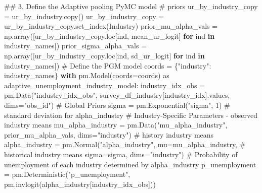\documentclass[
]{agujournal2019}
\newenvironment{Shaded}{\begin{snugshade}}{\end{snugshade}}
\newcommand{\CommentTok}[1]{\textcolor[rgb]{0.37,0.37,0.37}{#1}}
\newcommand{\ControlFlowTok}[1]{\textcolor[rgb]{0.00,0.23,0.31}{\textbf{#1}}}
\newcommand{\DecValTok}[1]{\textcolor[rgb]{0.68,0.00,0.00}{#1}}
\newcommand{\ImportTok}[1]{\textcolor[rgb]{0.00,0.46,0.62}{#1}}
\newcommand{\KeywordTok}[1]{\textcolor[rgb]{0.00,0.23,0.31}{\textbf{#1}}}
\newcommand{\NormalTok}[1]{\textcolor[rgb]{0.00,0.23,0.31}{#1}}
\newcommand{\OperatorTok}[1]{\textcolor[rgb]{0.37,0.37,0.37}{#1}}
\newcommand{\StringTok}[1]{\textcolor[rgb]{0.13,0.47,0.30}{#1}}
\begin{document}
\begin{Shaded}
\begin{Highlighting}[]
\CommentTok{\#\# 3. Define the Adaptive pooling PyMC model}
\CommentTok{\# priors}
\NormalTok{ur\_by\_industry\_copy }\OperatorTok{=}\NormalTok{ ur\_by\_industry.copy()}
\NormalTok{ur\_by\_industry\_copy }\OperatorTok{=}\NormalTok{ ur\_by\_industry\_copy.set\_index(}\StringTok{\textquotesingle{}Industry\textquotesingle{}}\NormalTok{)}
\NormalTok{prior\_mu\_alpha\_vals }\OperatorTok{=}\NormalTok{ np.array([ur\_by\_industry\_copy.loc[ind, }\StringTok{\textquotesingle{}mean\_ur\_logit\textquotesingle{}}\NormalTok{] }\ControlFlowTok{for}\NormalTok{ ind }\KeywordTok{in}\NormalTok{ industry\_names])}
\NormalTok{prior\_sigma\_alpha\_vals }\OperatorTok{=}\NormalTok{ np.array([ur\_by\_industry\_copy.loc[ind, }\StringTok{\textquotesingle{}sd\_ur\_logit\textquotesingle{}}\NormalTok{] }\ControlFlowTok{for}\NormalTok{ ind }\KeywordTok{in}\NormalTok{ industry\_names])}
\CommentTok{\# Define the PGM model}
\NormalTok{coords }\OperatorTok{=}\NormalTok{ \{}\StringTok{"industry"}\NormalTok{: industry\_names\}}
\ControlFlowTok{with}\NormalTok{ pm.Model(coords}\OperatorTok{=}\NormalTok{coords) }\ImportTok{as}\NormalTok{ adaptive\_unemployment\_industry\_model:}
\NormalTok{    industry\_idx\_obs }\OperatorTok{=}\NormalTok{ pm.Data(}\StringTok{"industry\_idx\_obs"}\NormalTok{, survey\_df\_industry[}\StringTok{\textquotesingle{}industry\_idx\textquotesingle{}}\NormalTok{].values, dims}\OperatorTok{=}\StringTok{"obs\_id"}\NormalTok{)}
    \CommentTok{\# Global Priors }
\NormalTok{    sigma }\OperatorTok{=}\NormalTok{ pm.Exponential(}\StringTok{"sigma"}\NormalTok{, }\DecValTok{1}\NormalTok{) }\CommentTok{\# standard deviation for alpha\_industry}
    \CommentTok{\# Industry{-}Specific Parameters {-} observed industry means}
\NormalTok{    mu\_alpha\_industry }\OperatorTok{=}\NormalTok{ pm.Data(}\StringTok{"mu\_alpha\_industry"}\NormalTok{, prior\_mu\_alpha\_vals, dims}\OperatorTok{=}\StringTok{"industry"}\NormalTok{) }\CommentTok{\# history industry means}
\NormalTok{    alpha\_industry }\OperatorTok{=}\NormalTok{ pm.Normal(}\StringTok{"alpha\_industry"}\NormalTok{, }
\NormalTok{                                mu}\OperatorTok{=}\NormalTok{mu\_alpha\_industry, }\CommentTok{\# historical industry means}
\NormalTok{                                sigma}\OperatorTok{=}\NormalTok{sigma,}
\NormalTok{                                dims}\OperatorTok{=}\StringTok{"industry"}\NormalTok{)}
    \CommentTok{\# Probability of unemployment of each industry determined by alpha\_industry}
\NormalTok{    p\_unemployment }\OperatorTok{=}\NormalTok{ pm.Deterministic(}\StringTok{"p\_unemployment"}\NormalTok{, pm.invlogit(alpha\_industry[industry\_idx\_obs]))}

\end{Highlighting}
\end{Shaded}
\end{document}
